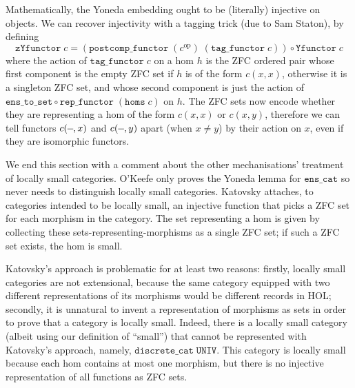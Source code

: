 \documentclass[twoside,titlepage,11pt]{article}
\begin{document}
Mathematically, the Yoneda embedding ought to be (literally) injective on objects.
We can recover injectivity with a tagging trick (due to Sam Staton), by defining
\[\mathtt{zYfunctor}\;c=(\mathtt{postcomp\_functor}\;(c^\mathrm{op})\;(\mathtt{tag\_functor}\;c))\circ\mathtt{Yfunctor}\;c\]
where the action of $\mathtt{tag\_functor}\;c$ on a hom $h$ is the ZFC ordered pair whose first component is the empty ZFC set if $h$ is of the form $c(x,x)$, otherwise it is a singleton ZFC set, and whose second component is just the action of $\mathtt{ens\_to\_set}\circ\mathtt{rep\_functor}\;(\mathtt{homs}\;c)$ on $h$.
The ZFC sets now encode whether they are representing a hom of the form $c(x,x)$ or $c(x,y)$, therefore we can tell functors $c(\blank,x)$ and $c(\blank,y)$ apart (when $x\neq y$) by their action on $x$, even if they are isomorphic functors.

We end this section with a comment about the other mechanisations' treatment of locally small categories.
O'Keefe only proves the Yoneda lemma for $\mathtt{ens\_cat}$ so never needs to distinguish locally small categories.
Katovsky attaches, to categories intended to be locally small, an injective function that picks a ZFC set for each morphism in the category.
The set representing a hom is given by collecting these sets-representing-morphisms as a single ZFC set; if such a ZFC set exists, the hom is small.

Katovsky's approach is problematic for at least two reasons: firstly, locally small categories are not extensional, because the same category equipped with two different representations of its morphisms would be different records in HOL; secondly, it is unnatural to invent a representation of morphisms as sets in order to prove that a category is locally small.
Indeed, there is a locally small category (albeit using our definition of ``small'') that cannot be represented with Katovsky's approach, namely, $\mathtt{discrete\_cat}\;\mathtt{UNIV}$.
This category is locally small because each hom contains at most one morphism, but there is no injective representation of all functions as ZFC sets.
\end{document}
